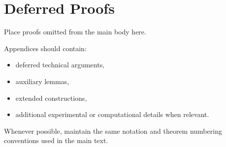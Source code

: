 \documentclass[
    letterpaper,
    runningheads,
    USenglish
  ]{llncs}
\begin{document}
\section{Deferred Proofs}
\label{appx:proofs}

Place proofs omitted from the main body here.

Appendices should contain:
\begin{itemize}
	\item deferred technical arguments,
	\item auxiliary lemmas,
	\item extended constructions,
	\item additional experimental or computational details when relevant.
\end{itemize}

Whenever possible, maintain the same notation and theorem numbering
conventions used in the main text.
\end{document}
